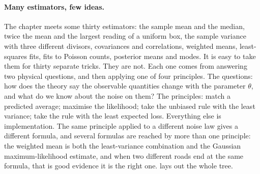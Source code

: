 \paragraph{Many estimators, few ideas.}
The chapter meets some thirty estimators: the sample mean and the median,
twice the mean and the largest reading of a uniform box, the sample variance
with three different divisors, covariances and correlations, weighted means,
least-squares fits, fits to Poisson counts, posterior means and modes. It is
easy to take them for thirty separate tricks. They are not. Each one comes
from answering two physical questions, and then applying one of four
principles. The questions: how does the theory say the observable quantities
change with the parameter $\theta$, and what do we know about the noise on
them? The principles: match a predicted average; maximise the likelihood;
take the unbiased rule with the least variance; take the rule with the least
expected loss. Everything else is implementation. The same principle applied
to a different noise law gives a different formula, and several formulas
are reached by more than one principle: the weighted mean is both the
least-variance combination and the Gaussian maximum-likelihood estimate, and
when two different roads end at the same formula, that is good evidence it
is the right one.  lays out the whole tree.

